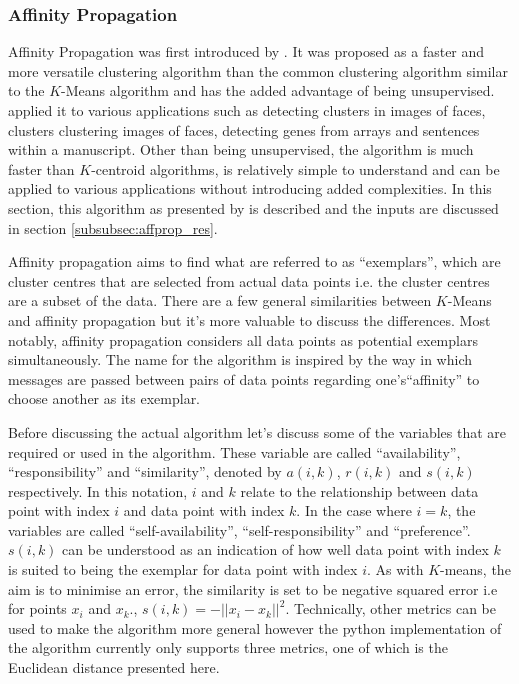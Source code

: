 \documentclass[a4paper]{article}
\begin{document}
\subsubsection{Affinity Propagation}
\label{subsubsec:afprop}
Affinity Propagation was first introduced by \cite{frey07}. It was proposed as a faster and more versatile clustering algorithm than the common clustering algorithm similar to the $K$-Means algorithm and has the added advantage of being unsupervised. \cite{frey07} applied it to various applications such as detecting clusters in images of faces, clusters clustering images of faces, detecting genes from arrays and sentences within a manuscript. Other than being unsupervised, the algorithm is much faster than $K$-centroid algorithms, is relatively simple to understand and can be applied to various applications without introducing added complexities. In this section, this algorithm as presented by \cite{frey07} is described and the inputs are discussed in section \ref{subsubsec:affprop_res}.

Affinity propagation aims to find what are referred to as ``exemplars'', which are cluster centres that are selected from actual data points i.e. the cluster centres are a subset of the data. There are a few general similarities between $K$-Means and affinity propagation but it's more valuable to discuss the differences. Most notably, affinity propagation considers all data points as potential exemplars simultaneously. The name for the algorithm is inspired by the way in which messages are passed between pairs of data points regarding one's``affinity'' to choose another as its exemplar.

Before discussing the actual algorithm let's discuss some of the variables that are required or used in the algorithm. These variable are called ``availability'', ``responsibility'' and ``similarity'', denoted by $a(i,k)$, $r(i,k)$ and $s(i,k)$ respectively. In this notation, $i$ and $k$ relate to the relationship between data point with index $i$ and data point with index $k$. In the case where $i=k$, the variables are called ``self-availability'', ``self-responsibility'' and ``preference''.  $s(i,k)$ can be understood as an indication of how well data point with index $k$ is suited to being the exemplar for data point with index $i$. As with $K$-means, the aim is to minimise an error, the similarity is set to be negative squared error i.e for points $x_i$ and $x_k$., $s(i,k) = -||x_i - x_k||^2$. Technically, other metrics can be used to make the algorithm more general however the python implementation of the algorithm currently only supports three metrics, one of which is the Euclidean distance presented here. 
\end{document}
